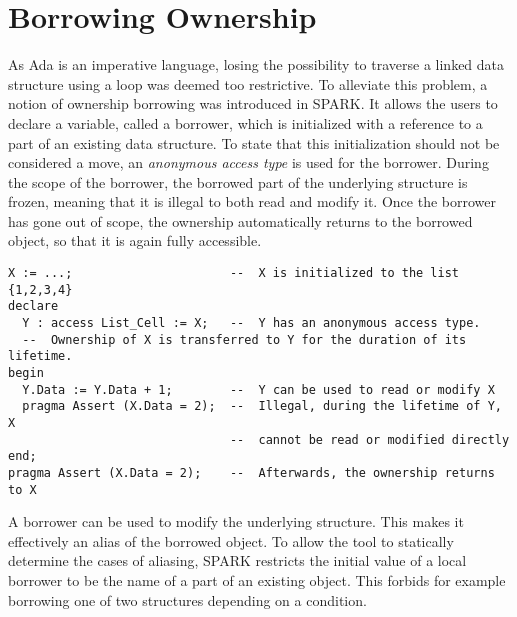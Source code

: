 \documentclass[runningheads]{llncs}
\begin{document}
\section{Borrowing Ownership}

As Ada is an imperative language, losing the possibility to traverse a linked data structure using a loop was deemed too restrictive. To alleviate this problem, a notion of ownership borrowing was introduced in SPARK. It allows the users to declare a variable, called a borrower, which is initialized with a reference to a part of an existing data structure. To state that this initialization should not be considered a move, an \emph{anonymous access type} is used for the borrower. During the scope of the borrower, the borrowed part of the underlying structure is frozen, meaning that it is illegal to both read and modify it. %
Once the borrower has gone out of scope, the ownership automatically returns to the borrowed object, so that it is again fully accessible.
\begin{lstlisting}
X := ...;                      --  X is initialized to the list {1,2,3,4}
declare
  Y : access List_Cell := X;   --  Y has an anonymous access type.
  --  Ownership of X is transferred to Y for the duration of its lifetime.
begin
  Y.Data := Y.Data + 1;        --  Y can be used to read or modify X
  pragma Assert (X.Data = 2);  --  Illegal, during the lifetime of Y, X
                               --  cannot be read or modified directly
end;
pragma Assert (X.Data = 2);    --  Afterwards, the ownership returns to X
\end{lstlisting}
A borrower can be used to modify the underlying structure. This makes it effectively an alias of the borrowed object. To allow the tool to statically determine the cases of aliasing, SPARK restricts the initial value of a local borrower to be the name of a part of an existing object. This forbids for example borrowing one of two structures depending on a condition.
\end{document}
